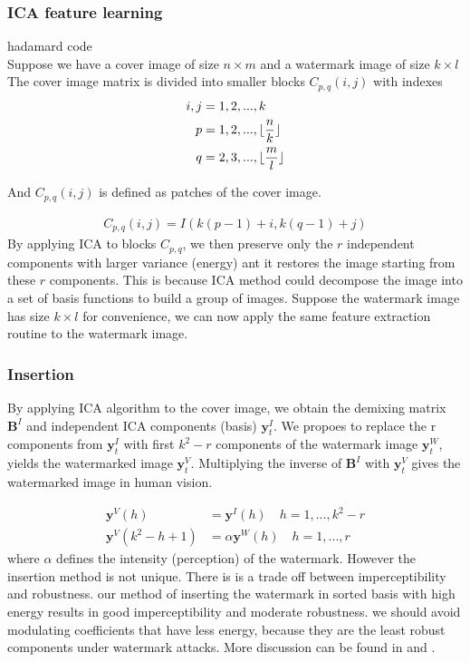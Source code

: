 \subsubsection{ICA feature learning}
hadamard code\\
Suppose we have a cover image of size $n\times m$ and a watermark image of size $k\times l$ The cover image matrix is divided into smaller blocks $C_{p,q}(i,j)$ with indexes
\begin{align}
    i,j &= 1,2,...,k\\
    p &= 1,2,...,\lfloor\frac{n}{k}\rfloor\\ 
    q &= 2,3,...,\lfloor\frac{m}{l}\rfloor 
\end{align}

And $C_{p,q}(i,j)$ is defined as patches of the cover image.

\begin{align}
    C_{p,q}(i,j) = I(k(p-1)+i, k(q-1)+j)
\end{align}
By applying ICA to blocks $C_{p,q}$, we then preserve only the $r$ independent components with larger variance (energy) ant it restores the image starting from these $r$ components. This is because ICA method could decompose the image into a set of basis functions to build a group of images. Suppose the watermark image has size $k \times l$ for convenience, we can now apply the same feature extraction routine to the watermark image.

\subsubsection{Insertion}
By applying ICA algorithm to the cover image, we obtain the demixing matrix $\mathbf{B}^I$ and independent ICA components (basis) $\mathbf{y}^I_t$. 
We propoes to replace the r components from $\mathbf{y}^I_t$ with first $k^2 -r$ components of the watermark image $\mathbf{y}^W_t$, yields the watermarked image  $\mathbf{y}^V_t$. Multiplying the inverse of $\mathbf{B}^I$ with $\mathbf{y}^V_t$ gives the watermarked image in human vision. 

\begin{align}
    \mathbf{y}^V(h) &=  \mathbf{y}^I(h) \quad h = 1,...,k^2-r \\
    \mathbf{y}^V(k^2-h+1) &= \alpha  \mathbf{y}^W(h) \quad h = 1,...,r
\end{align}
where $\alpha$ defines the intensity (perception) of the watermark. However the insertion method is not unique. 
There is is a trade off between imperceptibility and robustness. 
our method of inserting the watermark in sorted basis with high energy results in good imperceptibility and moderate robustness.
we should avoid modulating coefficients that have less energy, because they are the least robust components under watermark attacks. More discussion can be found in \cite{LuWei_ICA} and \cite{Yu2017}.

